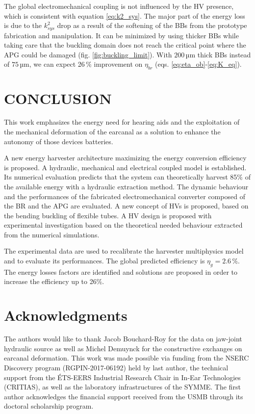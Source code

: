 \documentclass[3p,twocolumn,preprint]{elsarticle}
\begin{document}
The global electromechanical coupling is not influenced by the HV presence, which is consistent with equation \ref{eq:k2_sys}. The major part of the energy loss is due to the $k^2_{sys}$ drop as a result of the softening of the BBs from the prototype fabrication and manipulation. It can be minimized by using thicker BBs while taking care that the buckling domain does not reach the critical point where the APG could be damaged (fig. \ref{fig:buckling_limit}). With $200$\,µm thick BBs instead of $75$\,µm, we can expect 26\,\% improvement on $\eta_{br}$ (eqs. \ref{eq:eta_ob}-\ref{eq:K_eq}).
\section{CONCLUSION}
\label{sec:CONCLUSION}
This work emphasizes the energy need for hearing aids and the exploitation of the mechanical deformation of the earcanal as a solution to enhance the autonomy of those devices batteries.

A new energy harvester architecture maximizing the energy conversion efficiency is proposed. A hydraulic, mechanical and electrical coupled model is established. Its numerical evaluation predicts that the system can theoretically harvest 85\% of the available energy with a hydraulic extraction method. The dynamic behaviour and the performances of the fabricated electromechanical converter composed of the BR and the APG are evaluated. A new concept of HVs is proposed, based on the bending buckling of flexible tubes. A HV design is proposed with experimental investigation based on the theoretical needed behaviour extracted from the numerical simulations.

The experimental data are used to recalibrate the harvester multiphysics model and to evaluate its performances. The global predicted efficiency is $\eta_g=2.6\,\%$. The energy losses factors are identified and solutions are proposed in order to increase the efficiency up to 26\%.

\section{Acknowledgments}
The authors would like to thank Jacob Bouchard-Roy for the data on jaw-joint hydraulic source as well as Michel Demuynck for the constructive exchanges on earcanal deformation. This work was made possible via funding from the NSERC Discovery program (RGPIN-2017-06192) held by last author, the technical support from the ÉTS-EERS Industrial Research Chair in In-Ear Technologies (CRITIAS), as well as the laboratory infrastructures of the SYMME. The first author acknowledges the financial support received from the USMB through its doctoral scholarship program. 
\end{document}
